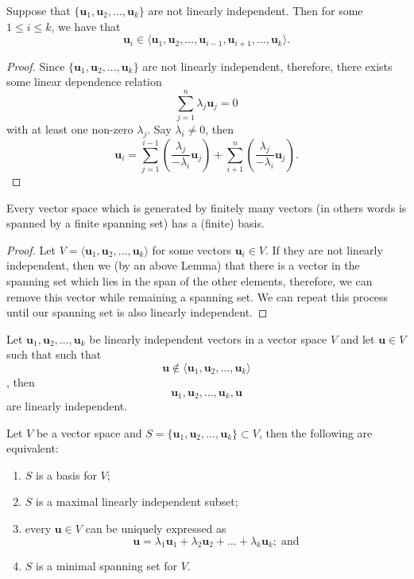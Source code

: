 \begin{lemma}
    Suppose that $\{\bm{u}_1, \bm{u}_2, \ldots, \bm{u}_k\}$ are not linearly independent. Then for some $1 \leq i \leq k$, we have that \[\bm{u}_i \in \langle \bm{u}_1, \bm{u}_2, \ldots, \bm{u}_{i - 1}, \bm{u}_{i + 1}, \ldots, \bm{u}_k \rangle.\]
\end{lemma}

\begin{proof}
    Since $\{\bm{u}_1, \bm{u}_2, \ldots, \bm{u}_k\}$ are not linearly independent, therefore, there exists some linear dependence relation \[\sum_{j = 1}^n \lambda_j \bm{u}_j = 0\] with at least one non-zero $\lambda_j$. Say $\lambda_i \neq 0$, then \[\bm{u}_i = \sum_{j = 1}^{i - 1} \left( \frac{\lambda_j}{-\lambda_i} \bm{u}_j \right) + \sum_{i+1}^n \left( \frac{\lambda_j}{-\lambda_i} \bm{u}_j \right).\]
\end{proof}

\begin{theorem}
    Every vector space which is generated by finitely many vectors (in others words is spanned by a finite spanning set) has a (finite) basis.
\end{theorem}

\begin{proof}
    Let $V = \langle \bm{u}_1, \bm{u}_2, \ldots, \bm{u}_k \rangle$ for some vectors $\bm{u}_i \in V$. If they are not linearly independent, then we (by an above Lemma) that there is a vector in the spanning set which lies in the span of the other elements, therefore, we can remove this vector while remaining a spanning set. We can repeat this process until our spanning set is also linearly independent.
\end{proof}

\begin{proposition}
    Let $\bm{u}_1, \bm{u}_2, \ldots, \bm{u}_k$ be linearly independent vectors in a vector space $V$ and let $\bm{u} \in V$ such that such that \[\bm{u} \not \in \langle \bm{u}_1, \bm{u}_2, \ldots, \bm{u}_k \rangle\], then \[\bm{u}_1, \bm{u}_2, \ldots, \bm{u}_k, \bm{u}\] are linearly independent.
\end{proposition}

\begin{theorem}
    Let $V$ be a vector space and $S=\{\bm{u}_1, \bm{u}_2, \ldots, \bm{u}_k\} \subset V$, then the following are equivalent:
    \begin{enumerate}
        \item $S$ is a basis for $V$;
        \item $S$ is a maximal linearly independent subset;
        \item every $\bm{u} \in V$ can be uniquely expressed as \[\bm{u} = \lambda_1 \bm{u}_1 + \lambda_2 \bm{u}_2 + \ldots + \lambda_k \bm{u}_k; \; \text{and} \]
        \item $S$ is a minimal spanning set for $V$.
    \end{enumerate}
\end{theorem}

